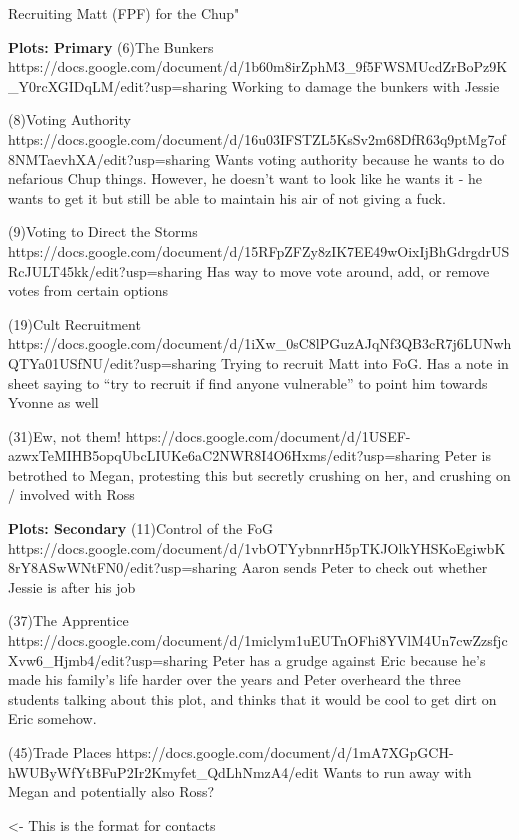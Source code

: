 \documentclass[char]{GL2020}
\begin{document}
Recruiting Matt (FPF) for the Chup"

\textbf{Plots: Primary}
(6)The Bunkers
https://docs.google.com/document/d/1b60m8irZphM3_9f5FWSMUcdZrBoPz9K_Y0rcXGIDqLM/edit?usp=sharing
Working to damage the bunkers with Jessie

(8)Voting Authority
https://docs.google.com/document/d/16u03IFSTZL5KsSv2m68DfR63q9ptMg7of8NMTaevhXA/edit?usp=sharing
 Wants voting authority because he wants to do nefarious Chup things.  However, he doesn’t want to look like he wants it - he wants to get it but still be able to maintain his air of not giving a fuck.

(9)Voting to Direct the Storms
https://docs.google.com/document/d/15RFpZFZy8zIK7EE49wOixIjBhGdrgdrUSRcJULT45kk/edit?usp=sharing
Has way to move vote around, add, or remove votes from certain options

(19)Cult Recruitment
https://docs.google.com/document/d/1iXw_0sC8lPGuzAJqNf3QB3cR7j6LUNwhQTYa01USfNU/edit?usp=sharing
Trying to recruit Matt into FoG.  Has a note in sheet saying to "`try to recruit if find anyone vulnerable"' to point him towards Yvonne as well

(31)Ew, not them!
https://docs.google.com/document/d/1USEF-azwxTeMIHB5opqUbcLIUKe6aC2NWR8I4O6Hxms/edit?usp=sharing
Peter is betrothed to Megan, protesting this but secretly crushing on her, and crushing on / involved with Ross

\textbf{Plots: Secondary}
(11)Control of the FoG
https://docs.google.com/document/d/1vbOTYybnnrH5pTKJOlkYHSKoEgiwbK8rY8ASwWNtFN0/edit?usp=sharing
Aaron sends Peter to check out whether Jessie is after his job

(37)The Apprentice
https://docs.google.com/document/d/1miclym1uEUTnOFhi8YVlM4Un7cwZzsfjcXvw6_Hjmb4/edit?usp=sharing
Peter has a grudge against Eric because he’s made his family’s life harder over the years and Peter overheard the three students talking about this plot, and thinks that it would be cool to get dirt on Eric somehow.  

(45)Trade Places
https://docs.google.com/document/d/1mA7XGpGCH-hWUByWfYtBFuP2Ir2Kmyfet_QdLhNmzA4/edit
Wants to run away with Megan and potentially also Ross?


\begin{itemz}[Goals]
	\item 
\end{itemz}

\begin{itemz}[Notes]
	\item 
\end{itemz}

\begin{contacts}
	\contact{\cTest{}} <- This is the format for contacts 
\end{contacts}
\end{document}
